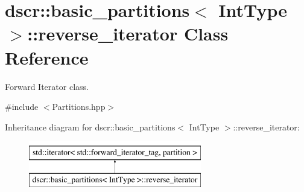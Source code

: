 \hypertarget{classdscr_1_1basic__partitions_1_1reverse__iterator}{\section{dscr\-:\-:basic\-\_\-partitions$<$ Int\-Type $>$\-:\-:reverse\-\_\-iterator Class Reference}
\label{classdscr_1_1basic__partitions_1_1reverse__iterator}
}


Forward Iterator class.  




{\ttfamily \#include $<$Partitions.\-hpp$>$}

Inheritance diagram for dscr\-:\-:basic\-\_\-partitions$<$ Int\-Type $>$\-:\-:reverse\-\_\-iterator\-:\begin{figure}[H]
\begin{center}
\leavevmode
\includegraphics[height=2.000000cm]{classdscr_1_1basic__partitions_1_1reverse__iterator}
\end{center}
\end{figure}
